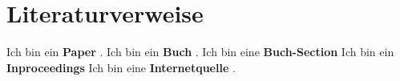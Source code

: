 \section{Literaturverweise}
\label{sec:literaturverweise}

Ich bin ein \textbf{Paper} \citep[S. 234]{Chang2006}.\newline
Ich bin ein \textbf{Buch} \citep[S. 20f.]{Goll2014}. \newline
Ich bin eine \textbf{Buch-Section} \citep[S. 55ff.]{Bolanos2013} \newline
Ich bin ein \textbf{Inproceedings} \citep[]{Rodenberg2013} \newline
Ich bin eine \textbf{Internetquelle} \citep[]{Caserta2014}. \newline
